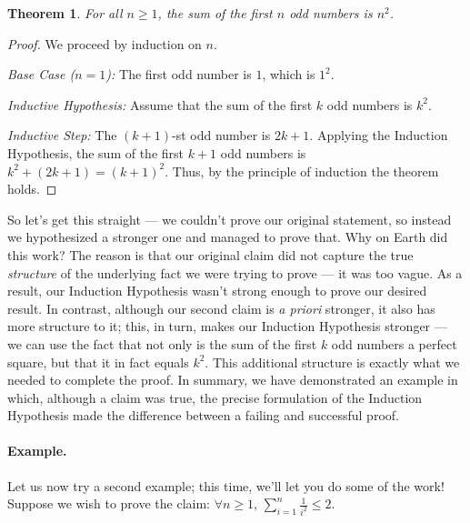 \documentclass[11pt]{article}
\newcounter{thm}
\newtheorem{theorem}{Theorem}[thm]
\begin{document}
\begin{theorem}\label{thm:sumodd}
    For all $n \geq 1$, the sum of the first $n$ odd numbers is $n^2$.
\end{theorem}
\begin{proof}
We proceed by induction on $n$.

\emph{Base Case ($n = 1$):} The first odd number is $1$, which is $1^2$.

\emph{Inductive Hypothesis:} Assume that the sum of the first $k$
odd numbers is $k^2$.

\emph{Inductive Step:} The $(k+1)$-st odd number is $2k+1$. Applying the Induction Hypothesis, the sum of the first $k+1$ odd numbers is $k^2 + (2k +1) = (k+1)^2$. Thus, by the principle of induction the theorem holds.
\end{proof}

So let's get this straight --- we couldn't prove our original statement, so instead we hypothesized a stronger one and managed to prove that. Why on Earth did this work? The reason is that our original claim did not capture the true \emph{structure} of the underlying fact we were trying to prove --- it was too vague. As a result, our Induction Hypothesis wasn't strong enough to prove our desired result. In contrast, although our second claim is \emph{a priori} stronger, it also has more structure to it; this, in turn, makes our Induction Hypothesis stronger --- we can use the fact that not only is the sum of the first $k$ odd numbers a perfect square, but that it in fact equals $k^2$. This additional structure is exactly what we needed to complete the proof. In summary, we have demonstrated an example in which, although a claim was true, the precise formulation of the Induction Hypothesis made the difference between a failing and successful proof.

\paragraph{Example.} Let us now try a second example; this time, we'll let you do some of the work! Suppose we wish to prove the claim: $\forall n \geq 1$, $\sum_{i=1}^n \frac{1}{i^2}\leq 2$.\\

\end{document}
